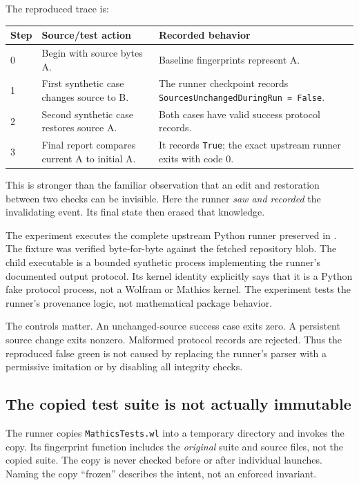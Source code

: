 \documentclass[11pt,a4paper]{article}
\newcommand{\code}[1]{\texttt{#1}}
\begin{document}
The reproduced trace is:
\begin{longtable}{@{}L{0.09\textwidth}L{0.37\textwidth}L{0.45\textwidth}@{}}
\toprule
Step & Source/test action & Recorded behavior\\
 & Begin with source bytes A. & Baseline fingerprints represent A.\\
1 & First synthetic case changes source to B. & The runner checkpoint records \code{SourcesUnchangedDuringRun = False}.\\
2 & Second synthetic case restores source A. & Both cases have valid success protocol records.\\
3 & Final report compares current A to initial A. & It records \code{True}; the exact upstream runner exits with code 0.\\
\bottomrule
\end{longtable}
This is stronger than the familiar observation that an edit and restoration between two checks can be invisible. Here the runner \emph{saw and recorded} the invalidating event. Its final state then erased that knowledge.

The experiment executes the complete upstream Python runner preserved in . The fixture was verified byte-for-byte against the fetched repository blob. The child executable is a bounded synthetic process implementing the runner's documented output protocol. Its kernel identity explicitly says that it is a Python fake protocol process, not a Wolfram or Mathics kernel. The experiment tests the runner's provenance logic, not mathematical package behavior.

The controls matter. An unchanged-source success case exits zero. A persistent source change exits nonzero. Malformed protocol records are rejected. Thus the reproduced false green is not caused by replacing the runner's parser with a permissive imitation or by disabling all integrity checks.

\subsection{The copied test suite is not actually immutable}
The runner copies \code{MathicsTests.wl} into a temporary directory and invokes the copy. Its fingerprint function includes the \emph{original} suite and source files, not the copied suite. The copy is never checked before or after individual launches. Naming the copy ``frozen'' describes the intent, not an enforced invariant.\cite{runner}
\end{document}
